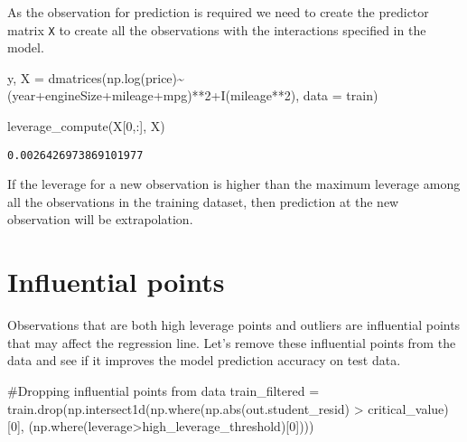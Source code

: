 \documentclass[
  letterpaper,
  DIV=11,
  numbers=noendperiod]{scrreprt}
\newenvironment{Shaded}{\begin{snugshade}}{\end{snugshade}}
\newcommand{\BuiltInTok}[1]{\textcolor[rgb]{0.00,0.23,0.31}{#1}}
\newcommand{\CommentTok}[1]{\textcolor[rgb]{0.37,0.37,0.37}{#1}}
\newcommand{\DecValTok}[1]{\textcolor[rgb]{0.68,0.00,0.00}{#1}}
\newcommand{\NormalTok}[1]{\textcolor[rgb]{0.00,0.23,0.31}{#1}}
\newcommand{\OperatorTok}[1]{\textcolor[rgb]{0.37,0.37,0.37}{#1}}
\newcommand{\StringTok}[1]{\textcolor[rgb]{0.13,0.47,0.30}{#1}}
\begin{document}
As the observation for prediction is required we need to create the
predictor matrix \texttt{X} to create all the observations with the
interactions specified in the model.

\begin{Shaded}
\begin{Highlighting}[]
\NormalTok{y, X }\OperatorTok{=}\NormalTok{ dmatrices(}\StringTok{\textquotesingle{}np.log(price)\textasciitilde{}(year+engineSize+mileage+mpg)**2+I(mileage**2)\textquotesingle{}}\NormalTok{, data }\OperatorTok{=}\NormalTok{ train)}
\end{Highlighting}
\end{Shaded}

\begin{Shaded}
\begin{Highlighting}[]
\NormalTok{leverage\_compute(X[}\DecValTok{0}\NormalTok{,:], X)}
\end{Highlighting}
\end{Shaded}

\begin{verbatim}
0.0026426973869101977
\end{verbatim}

If the leverage for a new observation is higher than the maximum
leverage among all the observations in the training dataset, then
prediction at the new observation will be extrapolation.

\section{Influential points}\label{influential-points}

Observations that are both high leverage points and outliers are
influential points that may affect the regression line. Let's remove
these influential points from the data and see if it improves the model
prediction accuracy on test data.

\begin{Shaded}
\begin{Highlighting}[]
\CommentTok{\#Dropping influential points from data}
\NormalTok{train\_filtered }\OperatorTok{=}\NormalTok{ train.drop(np.intersect1d(np.where(np.}\BuiltInTok{abs}\NormalTok{(out.student\_resid) }\OperatorTok{\textgreater{}}\NormalTok{ critical\_value)[}\DecValTok{0}\NormalTok{],}
\NormalTok{                                           (np.where(leverage}\OperatorTok{\textgreater{}}\NormalTok{high\_leverage\_threshold)[}\DecValTok{0}\NormalTok{])))}
\end{Highlighting}
\end{Shaded}
\end{document}
